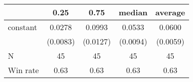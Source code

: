 \begin{tabular}{lcccc}
\hline
         &   0.25   &   0.75   &  median  & average   \\
\midrule
\midrule
constant & 0.0278   & 0.0993   & 0.0533   & 0.0600    \\
         & (0.0083) & (0.0127) & (0.0094) & (0.0059)  \\
N        & 45       & 45       & 45       & 45        \\
Win rate & 0.63     & 0.63     & 0.63     & 0.63      \\
\hline
\end{tabular}